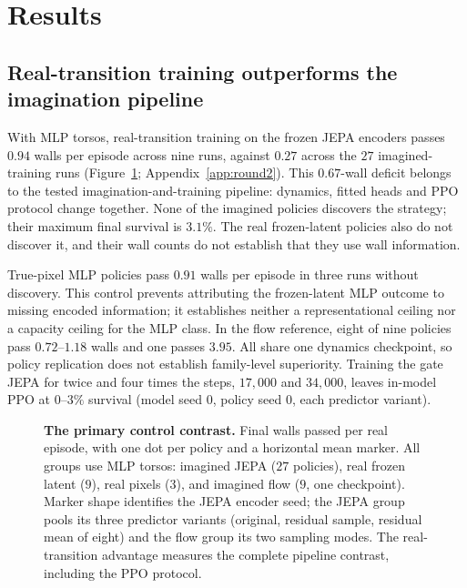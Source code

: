 \section{Results}
\label{sec:results}

\subsection{Real-transition training outperforms the imagination pipeline}
\label{sec:results-ppo}

With MLP torsos, real-transition training on the frozen JEPA encoders passes $0.94$ walls per episode
across nine runs, against $0.27$ across the $27$ imagined-training runs
(Figure~\ref{fig:contrast}; Appendix~\ref{app:round2}). This $0.67$-wall deficit belongs to the tested
imagination-and-training pipeline: dynamics, fitted heads and PPO protocol change together.
None of the imagined policies discovers the strategy; their maximum final survival is $3.1\%$.
The real frozen-latent policies also do not discover it, and their wall counts do not establish that
they use wall information.

True-pixel MLP policies pass $0.91$ walls per episode in three runs without discovery. This control
prevents attributing the frozen-latent MLP outcome to missing encoded information; it establishes
neither a representational ceiling nor a capacity ceiling for the MLP class. In the flow reference,
eight of nine policies pass $0.72$--$1.18$ walls and one passes $3.95$.
All share one dynamics checkpoint, so policy replication does not establish family-level superiority.
Training the gate JEPA for twice and four times the steps, $17{,}000$ and $34{,}000$, leaves in-model
PPO at $0$--$3\%$ survival (model seed $0$, policy seed $0$, each predictor variant).

\begin{figure}[t]
\centering
\renewcommand{\figureheight}{1.50in}
\caption{\textbf{The primary control contrast.} Final walls passed per real episode, with one dot per
policy and a horizontal mean marker. All groups use MLP torsos: imagined JEPA ($27$ policies),
real frozen latent ($9$), real pixels ($3$), and imagined flow ($9$, one checkpoint).
Marker shape identifies the JEPA encoder seed; the JEPA group pools its three predictor variants (original, residual sample, residual mean of eight) and the flow group its two sampling modes.
The real-transition advantage measures the complete pipeline contrast, including the PPO protocol.}
\label{fig:contrast}
\end{figure}

